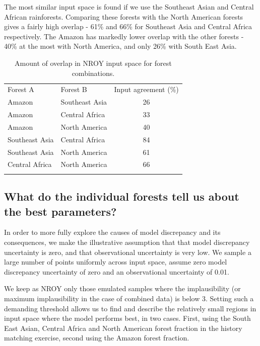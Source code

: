 \documentclass[esd, manuscript]{copernicus}
\begin{document}
The most similar input space is found if we use the Southeast Asian and Central African rainforests. Comparing these forests with the North American forests gives a fairly high overlap - 61\% and 66\% for Southeast Asia and Central Africa respectively. The Amazon has markedly lower overlap with the other forests - 40\% at the most with North America, and only 26\% with South East Asia.


\begin{table}[t]
\caption{Amount of overlap in NROY input space for forest combinations.}\label{tab:input_overlap}
\begin{tabular}{llc}

\tophline
Forest A &  Forest B & Input agreement (\%) \\
Amazon & Southeast Asia & 26 \\
Amazon & Central Africa & 33 \\
Amazon & North America & 40 \\
Southeast Asia & Central Africa & 84 \\
Southeast Asia & North America & 61 \\
Central Africa  & North America & 66 \\
\bottomhline
\end{tabular}
\belowtable{} %
\end{table}

\subsection{What do the individual forests tell us about the best parameters?}\label{ssec:learn}
In order to more fully explore the causes of model discrepancy and its consequences, we make the illustrative assumption that that model discrepancy uncertainty is zero, and that observational uncertainty is very low. We sample a large number of points uniformly across input space, assume zero model discrepancy uncertainty of zero and an observational uncertainty of 0.01.

We keep as NROY only those emulated samples where the implausibility (or maximum implausibility in the case of combined data) is below 3. Setting such a demanding threshold allows us to find and describe the relatively small regions in input space where the model performs best, in two cases. First, using the South East Asian, Central Africa and North American forest fraction in the history matching exercise, second using the Amazon forest fraction.
\end{document}
